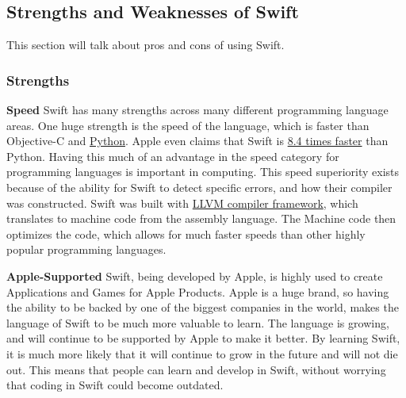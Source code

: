 \documentclass{article}
\theoremstyle{theorem}
\theoremstyle{definition}
\theoremstyle{remark}
\begin{document}
\subsection{Strengths and Weaknesses of Swift}
This section will talk about pros and cons of using Swift.
\subsubsection{Strengths}
\textbf{Speed}\newline
Swift has many strengths across many different programming language areas. One huge strength is the speed of the language, which is faster than Objective-C and \href{https://www.geeksforgeeks.org/difference-between-python-and-swift/}{Python}. Apple even claims that Swift is \href{https://www.apple.com/swift/}{8.4 times faster} than Python. Having this much of an advantage in the speed category for programming languages is important in computing. This speed superiority exists because of the ability for Swift to detect specific errors, and how their compiler was constructed. Swift was built with \href{https://www.altexsoft.com/blog/engineering/the-good-and-the-bad-of-swift-programming-language/}{LLVM compiler framework}, which translates to machine code from the assembly language. The Machine code then optimizes the code, which allows for much faster speeds than other highly popular programming languages.\newline\newline

\noindent \textbf{Apple-Supported} \newline
Swift, being developed by Apple, is highly used to create Applications and Games for Apple Products. Apple is a huge brand, so having the ability to be backed by one of the biggest companies in the world, makes the language of Swift to be much more valuable to learn. The language is growing, and will continue to be supported by Apple to make it better. By learning Swift, it is much more likely that it will continue to grow in the future and will not die out. This means that people can learn and develop in Swift, without worrying that coding in Swift could become outdated.\newline \newline
\end{document}
